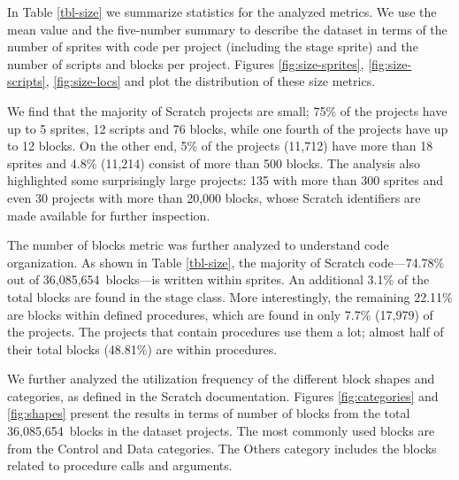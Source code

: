 \documentclass{sig-alternate}
\newcommand{\nLOC}{36,085,654}
\begin{document}
In Table \ref{tbl-size} we summarize statistics for the analyzed metrics. We use the mean value and the five-number summary to describe the dataset in terms of the number of sprites with code per project (including the stage sprite) and the number of scripts and blocks per project. Figures \ref{fig:size-sprites}, \ref{fig:size-scripts}, \ref{fig:size-locs} and plot the distribution of these size metrics.

We find that the majority of Scratch projects are small; 75\% of the projects have up to 5 sprites, 12 scripts and 76 blocks, while one fourth of the projects have up to 12 blocks. On the other end, 5\% of the projects (11,712) have more than 18 sprites and 4.8\% (11,214) consist of more than 500 blocks. The analysis also highlighted some surprisingly large projects: 135 with more than 300 sprites and even 30 projects with more than 20,000 blocks, whose Scratch identifiers are made available for further inspection.\footnotemark[\ref{repo}]

The number of blocks metric was further analyzed to understand code organization. As shown in Table \ref{tbl-size}, the majority of Scratch code---74.78\% out of \nLOC~blocks---is written within sprites. An additional 3.1\% of the total blocks are found in the stage class. More interestingly, the remaining 22.11\% are blocks within defined procedures, which are found in only 7.7\% (17,979) of the projects. The projects that contain procedures use them a lot; almost half of their total blocks (48.81\%) are within procedures.

We further analyzed the utilization frequency of the different block shapes and categories, as defined in the Scratch documentation. Figures \ref{fig:categories} and \ref{fig:shapes} present the results in terms of number of blocks from the total \nLOC~blocks in the dataset projects. The most commonly used blocks are from the Control and Data categories. The Others category includes the blocks related to procedure calls and arguments.
\end{document}
